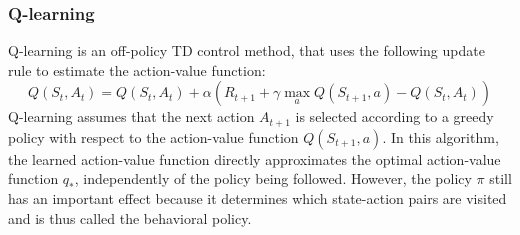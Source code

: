\subsubsection{Q-learning}
Q-learning is an off-policy TD control method, that uses the following update rule to estimate the action-value function:
\begin{equation}
    Q(S_t, A_t) = Q(S_t, A_t) + \alpha (R_{t+1} + \gamma \max_a{Q(S_{t+1}, a)} - Q(S_t, A_t))
    \label{Q-learning-update}
\end{equation}
Q-learning assumes that the next action $A_{t+1}$ is selected according to a greedy policy with respect to the action-value function $Q(S_{t+1}, a)$. In this algorithm, the learned action-value function directly approximates the optimal action-value function $q_*$, independently of the policy being followed. However, the policy $\pi$ still has an important effect because it determines which state-action pairs are visited and is thus called the behavioral policy. 
